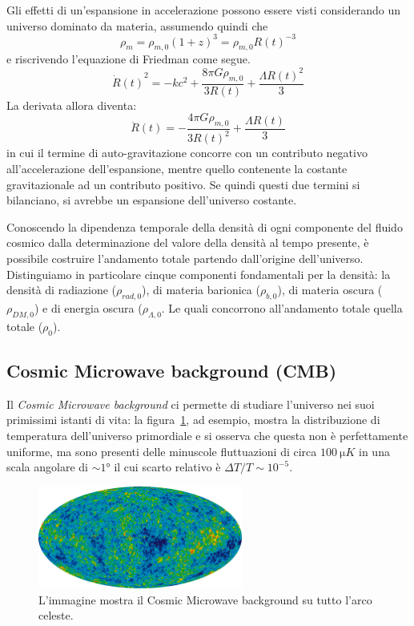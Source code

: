 Gli effetti di un'espansione in accelerazione possono essere visti considerando un universo dominato da materia, assumendo quindi che
\[
    \rho_{m} = \rho_{m, 0}{(1+z)}^3 = \rho_{m,0}{R(t)}^{-3}
\]
e riscrivendo l'equazione di Friedman come segue.
\[
    {\dot{R}(t)}^2 = - kc^2 + \frac{8\pi G \rho_{m,0}}{3R(t)} + \frac{\Lambda {R(t)}^2}{3}
\]
La derivata allora diventa:
\[
    {\ddot{R}(t)} = -\frac{4\pi G \rho_{m,0}}{3{R(t)}^2}+ \frac{\Lambda R(t)}{3}
\]
in cui il termine di auto-gravitazione concorre con un contributo negativo all'accelerazione dell'espansione, mentre quello contenente la costante gravitazionale ad un contributo positivo. Se quindi questi due termini si bilanciano, si avrebbe un espansione dell'universo costante.

Conoscendo la dipendenza temporale della densità di ogni componente del fluido cosmico dalla determinazione del valore della densità al tempo presente, è possibile costruire l'andamento totale partendo dall'origine dell'universo. Distinguiamo in particolare cinque componenti fondamentali per la densità: la densità di radiazione ($\rho_{rad, 0}$), di materia barionica ($\rho_{b, 0}$), di materia oscura ($\rho_{DM, 0}$) e di energia oscura ($\rho_{\Lambda, 0}$. Le quali concorrono all'andamento totale quella totale ($\rho_{0}$).

\subsection{Cosmic Microwave background (CMB)}\label{sec:CMB}
Il \textit{Cosmic Microwave background} ci permette di studiare l'universo nei suoi primissimi istanti di vita: la figura~\ref{fig:CMB1}, ad esempio, mostra la distribuzione di temperatura dell'universo primordiale e si osserva che questa non è perfettamente uniforme, ma sono presenti delle minuscole fluttuazioni di circa $\SI{100}{\micro K}$ in una scala angolare di $\sim 1\si{\degree}$ il cui scarto relativo è $\Delta T/T \sim 10^{-5}$.
\begin{figure}
    \centering
    \includegraphics[width = 0.6\textwidth]{immagini/CMB1.png}
    \caption{L'immagine mostra il Cosmic Microwave background su tutto l'arco celeste.}\label{fig:CMB1}
\end{figure}

